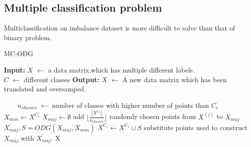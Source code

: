 \documentclass[ida]{iosart2x}
\begin{document}
\subsection{Multiple classification problem}

Multiclassification on imbalance dataset is more difficult to solve than that of binary problem. 
\begin{algorithm}[tb]
    \caption{MC-ODG} %
    \setlength{\abovedisplayskip}{3pt}
    \setlength{\belowdisplayskip}{3pt}
    \label{alg2}
    \hspace*{0.02in} {\bf Input:} %
     $X$ $\leftarrow$ a data matrix,which has multiple different labels.  \\
     $C$ $\leftarrow$ different classes
    \hspace*{0.02in} {\bf Output:} %
     $X$ $\leftarrow$ A new data matrix which has been translated and oversamped.
    \begin{algorithmic}[1]
     
    　　\State $n_{classes}$ $\leftarrow$ number of classes with higher number of points than $C_i$ 
          \State $X_{min} \leftarrow X^{C_i}$ 
          \State $X_{maj} \leftarrow \emptyset$
              \State add $\lfloor \frac{|X^{C_1}|}{n_{classes}} \rfloor$ randomly chosen points from $X^{(j)}$ to $X_{maj}$
          \EndFor
          \State $X_{maj}^{'},S=ODG(X_{maj},X_{min})$
          \State $X^{C_i} \leftarrow X^{C_i} \cup S$
          \State substitute points used to construct $X_{maj}$ with $X_{maj}^{'}$. 
        \EndIf
    \EndFor
    \State \Return X
    \end{algorithmic}
    \end{algorithm}
\end{document}

